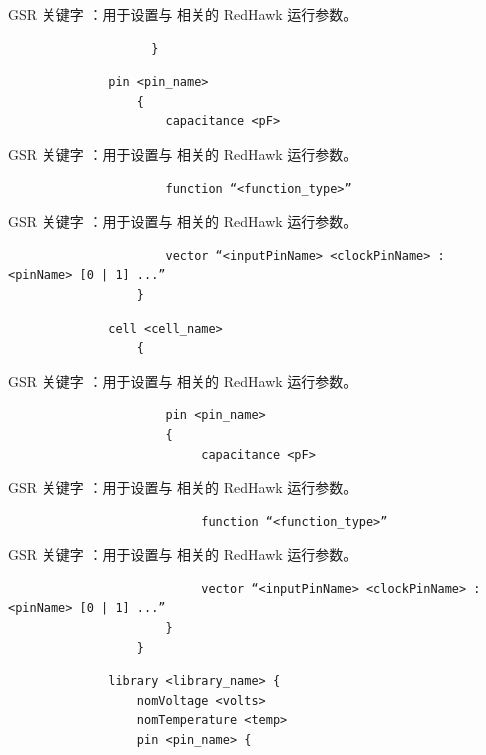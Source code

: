 GSR 关键字 ：用于设置与  相关的 RedHawk 运行参数。

\begin{lstlisting}
                    }
\end{lstlisting}

\begin{lstlisting}
              pin <pin_name>
                  {
                      capacitance <pF>
\end{lstlisting}

GSR 关键字 ：用于设置与  相关的 RedHawk 运行参数。

\begin{lstlisting}
                      function “<function_type>”
\end{lstlisting}

GSR 关键字 ：用于设置与  相关的 RedHawk 运行参数。

\begin{lstlisting}
                      vector “<inputPinName> <clockPinName> : <pinName> [0 | 1] ...”
                  }
\end{lstlisting}

\begin{lstlisting}
              cell <cell_name>
                  {
\end{lstlisting}

GSR 关键字 ：用于设置与  相关的 RedHawk 运行参数。

\begin{lstlisting}
                      pin <pin_name>
                      {
                           capacitance <pF>
\end{lstlisting}

GSR 关键字 ：用于设置与  相关的 RedHawk 运行参数。

\begin{lstlisting}
                           function “<function_type>”
\end{lstlisting}

GSR 关键字 ：用于设置与  相关的 RedHawk 运行参数。

\begin{lstlisting}
                           vector “<inputPinName> <clockPinName> : <pinName> [0 | 1] ...”
                      }
                  }
\end{lstlisting}

\begin{lstlisting}
              library <library_name> {
                  nomVoltage <volts>
                  nomTemperature <temp>
                  pin <pin_name> {
\end{lstlisting}

